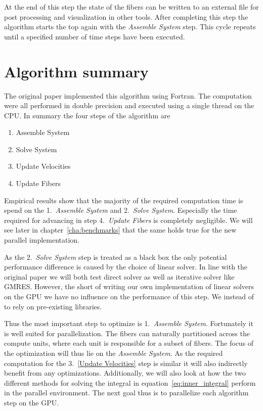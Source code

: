 \documentclass[a4paper,11pt]{kth-mag}
\begin{document}
At the end of this step the state of the fibers can be written to an external file for post processing and visualization in other tools. After completing this step the algorithm starts the top again with the \emph{Assemble System} step. This cycle repeats until a specified number of time steps have been executed.

\section{Algorithm summary}

The original paper implemented this algorithm using Fortran. The computation were all performed in double precision and executed using a single thread on the CPU. In summary the four steps of the algorithm are
\begin{enumerate}
  \item Assemble System
  \item Solve System
  \item Update Velocities
  \item Update Fibers
\end{enumerate}

Empirical results show that the majority of the required computation time is spend on the 1.~\emph{Assemble System} and 2.~\emph{Solve System}. Especially the time required for advancing in step 4.~\emph{Update Fibers} is completely negligible. We will see later in chapter~\ref{cha:benchmarks} that the same holds true for the new parallel implementation.

As the 2.~\emph{Solve System} step is treated as a black box the only potential performance difference is caused by the choice of linear solver. In line with the original paper we will both test direct solver as well as iterative solver like GMRES. However, the short of writing our own implementation of linear solvers on the GPU we have no influence on the performance of this step. We instead of to rely on pre-existing libraries.

Thus the most important step to optimize is 1.~\emph{Assemble System}. Fortunately it is well suited for parallelization. The fibers can naturally partitioned across the compute units, where each unit is responsible for a subset of fibers. The focus of the optimization will thus lie on the \emph{Assemble System}. As the required computation for the 3.~\ref{Update Velocities} step is similar it will also indirectly benefit from any optimizations. Additionally, we will also look at how the two different methods for solving the integral in equation~\ref{eq:inner_integral} perform in the parallel environment. The next goal thus is to parallelize each algorithm step on the GPU.
\end{document}
